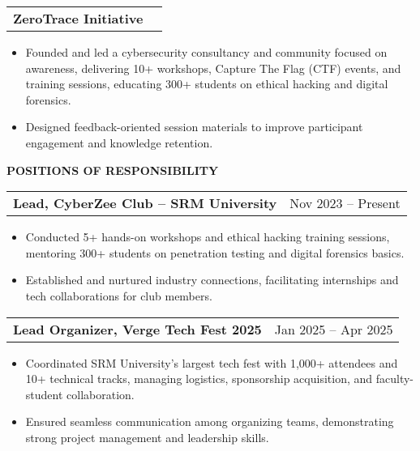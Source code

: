 \documentclass[a4paper]{article}
\begin{document}
\vspace{0.4em} 
\begin{tabularx}{\textwidth}{@{}X r@{}} 
\textbf{ZeroTrace Initiative} & 
\end{tabularx} 
\vspace{-0.2em} 
\begin{itemize} 
\item Founded and led a cybersecurity consultancy and community focused on awareness, delivering 10+ workshops, Capture The Flag (CTF) events, and training sessions, educating 300+ students on ethical hacking and digital forensics. 
\item Designed feedback-oriented session materials to improve participant engagement and knowledge retention. 
\end{itemize} 
\begin{sectionbox}\textbf{POSITIONS OF RESPONSIBILITY}\end{sectionbox} 
\vspace{0em} 
\begin{tabularx}{\textwidth}{@{}X r@{}} 
\textbf{Lead, CyberZee Club – SRM University} & Nov 2023 -- Present \\ 
\end{tabularx} 
\begin{itemize} 
\item Conducted 5+ hands-on workshops and ethical hacking training sessions, mentoring 300+ students on penetration testing and digital forensics basics. 
\item Established and nurtured industry connections, facilitating internships and tech collaborations for club members. 
\end{itemize} 
\vspace{0.3em} 
\begin{tabularx}{\textwidth}{@{}X r@{}} 
\textbf{Lead Organizer, Verge Tech Fest 2025} & Jan 2025 -- Apr 2025 \\ 
\end{tabularx} 
\begin{itemize} 
\item Coordinated SRM University's largest tech fest with 1,000+ attendees and 10+ technical tracks, managing logistics, sponsorship acquisition, and faculty-student collaboration. 
\item Ensured seamless communication among organizing teams, demonstrating strong project management and leadership skills. 
\end{itemize} 
\end{document}
